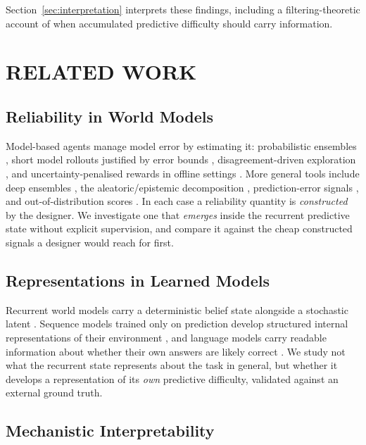 \documentclass[a4paper,twoside]{article}
\begin{document}
Section~\ref{sec:interpretation} interprets these findings, including a filtering-theoretic account of when accumulated predictive difficulty should carry information.

\section{\uppercase{Related Work}}
\label{sec:related}

\subsection{Reliability in World Models}

Model-based agents manage model error by estimating it: probabilistic ensembles \cite{chua2018pets}, short model rollouts justified by error bounds \cite{janner2019mbpo}, disagreement-driven exploration \cite{sekar2020plan2explore}, and uncertainty-penalised rewards in offline settings \cite{yu2020mopo}. More general tools include deep ensembles \cite{lakshminarayanan2017ensembles}, the aleatoric/epistemic decomposition \cite{kendall2017uncertainties}, prediction-error signals \cite{pathak2017curiosity}, and out-of-distribution scores \cite{hendrycks2017baseline}. In each case a reliability quantity is \emph{constructed} by the designer. We investigate one that \emph{emerges} inside the recurrent predictive state without explicit supervision, and compare it against the cheap constructed signals a designer would reach for first.

\subsection{Representations in Learned Models}

Recurrent world models carry a deterministic belief state alongside a stochastic latent \cite{hafner2019planet,hafner2021dreamerv2}. Sequence models trained only on prediction develop structured internal representations of their environment \cite{li2023othello}, and language models carry readable information about whether their own answers are likely correct \cite{kadavath2022know}. We study not what the recurrent state represents about the task in general, but whether it develops a representation of its \emph{own} predictive difficulty, validated against an external ground truth.

\subsection{Mechanistic Interpretability}
\end{document}
